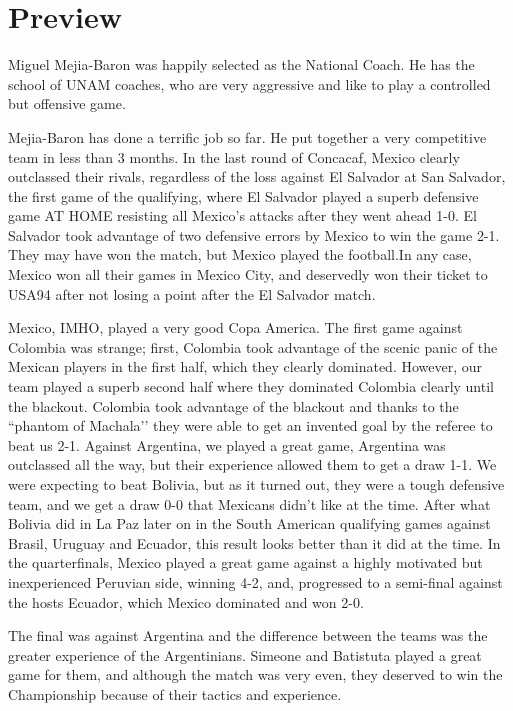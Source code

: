 \section{Preview}
Miguel Mejia-Baron was happily selected as the National Coach. He has the
school of UNAM coaches, who are very aggressive and like to play a controlled
but offensive game.

Mejia-Baron has done a terrific job so far. He put together a very competitive
team in less than 3 months. In the last round of Concacaf, Mexico clearly 
outclassed their rivals, regardless of the loss against El Salvador at 
San Salvador, the first game of the qualifying, where El Salvador played a 
superb defensive game AT HOME resisting all Mexico's attacks after they went 
ahead 1-0. El Salvador took advantage of two defensive errors by Mexico to win 
the game 2-1. They may have won the match, but Mexico played the football.In 
any case, Mexico won all their games in Mexico City, and deservedly won their
ticket to USA94 after not losing a point after the El Salvador match.

Mexico, IMHO, played a very good Copa America. The first game against Colombia
was strange; first, Colombia took advantage of the scenic panic of the Mexican
players in the first half, which they clearly dominated. However, our team 
played a superb second half where they dominated Colombia clearly until the 
blackout. Colombia took advantage of the blackout and thanks to the 
``phantom of Machala’’ they were able to get an invented goal by the referee 
to beat us 2-1. Against Argentina, we played a great game, Argentina was 
outclassed all the way, but their experience allowed them to get a draw 1-1.
We were expecting to beat Bolivia, but as it turned out, they were a tough 
defensive team, and we get a draw 0-0 that Mexicans didn't like at the time. 
After what Bolivia did in La Paz later on in the South American qualifying 
games against Brasil, Uruguay and Ecuador, this result looks better than it did
at the time. In the quarterfinals, Mexico played a great game against a highly
motivated but inexperienced Peruvian side, winning 4-2, and, progressed to
a semi-final against the hosts Ecuador, which Mexico dominated and won 2-0.

The final was against Argentina and the difference between the teams was the 
greater experience of the Argentinians. Simeone and Batistuta played a great
game for them, and although the match was very even, they deserved to win the
Championship because of their tactics and experience.

